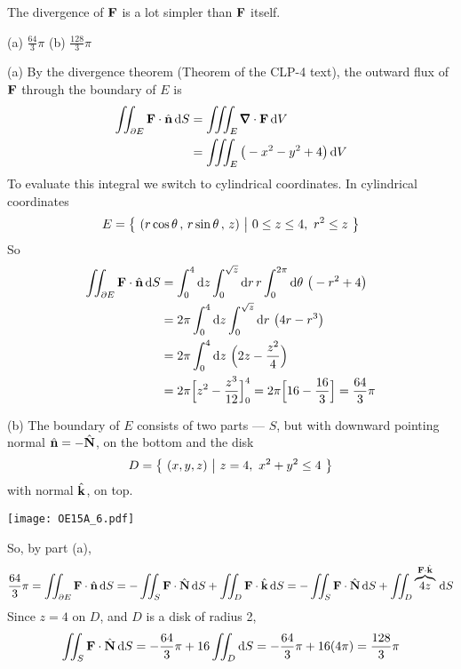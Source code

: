\begin{hint} 
The divergence of $\mathbf{F}$ is a lot simpler than $\mathbf{F}$ itself.
\end{hint}

\begin{answer} 
(a) $\frac{64}{3}\pi$\qquad
(b) $\frac{128}{3}\pi$
\end{answer}

\begin{solution} (a)
By the divergence theorem (Theorem  of the 
CLP-4 text), the outward flux of $\mathbf{F}$ through the boundary of $E$ is
\begin{align*}
\dblInt_{\partial E}\vF\cdot\hn\,\dee{S}
&=\tripInt_E \vnabla\cdot\vF\,\dee{V} \\
&=\tripInt_E \big(-x^2-y^2+4\big)\,\dee{V} 
\end{align*}
To evaluate this integral we switch to cylindrical coordinates.
In cylindrical coordinates
\begin{equation*}
E=\big\{ \ (r\cos\theta\,,\,r\sin\theta\,,\,z)\ \big|\ 0\le z\le 4,\ r^2\le z\ \big\}
\end{equation*}
So
\begin{align*}
\dblInt_{\partial E}\vF\cdot\hn\,\dee{S}
&=\int_0^4\dee{z}\int_0^{\sqrt{z}}\dee{r}\,r\int_0^{2\pi}\dee{\theta}\ 
         \big(-r^2+4\big) \\
&=2\pi \int_0^4\dee{z}\int_0^{\sqrt{z}}\dee{r}\ \big(4r-r^3\big) \\
&=2\pi \int_0^4\dee{z}\ \Big(2z-\frac{z^2}{4}\Big) \\
&= 2\pi\Big[z^2-\frac{z^3}{12}\Big]_0^4
=2\pi\Big[16-\frac{16}{3}\Big]
=\frac{64}{3}\pi
\end{align*}

(b) The boundary of $E$ consists of two parts --- $S$, but with downward
pointing normal $\hat{\mathbf{n}} = -\hat{\mathbf{N}}$, on the bottom and the disk
\begin{equation*}
D =\big\{ \ (x,y,z)\ \big|\ z=4,\ x^2+y^2\le 4\ \big\}
\end{equation*} 
with normal $\hat{\mathbf{k}}$, on top.
 \begin{center}
    \texttt{[image: OE15A\_6.pdf]}
\end{center}
So, by part (a),
\begin{align*}
\frac{64}{3}\pi =\iint_{\partial E}\mathbf{F}\cdot\hat{\mathbf{n}}\,\mathrm{d}S
=-\iint_S \mathbf{F}\cdot\hat{\mathbf{N}}\,\mathrm{d}S 
  +\iint_D \mathbf{F}\cdot\hat{\mathbf{k}}\,\mathrm{d}S
=-\iint_S \mathbf{F}\cdot\hat{\mathbf{N}}\,\mathrm{d}S 
  +\iint_D \overbrace{4z}^{\mathbf{F}\cdot\hat{\mathbf{k}}}\,\mathrm{d}S
\end{align*}
Since $z=4$ on $D$, and $D$ is a disk of radius 2,
\begin{align*}
\iint_S \mathbf{F}\cdot\hat{\mathbf{N}}\,\mathrm{d}S 
=-\frac{64}{3}\pi +16\iint_D \mathrm{d}S
=-\frac{64}{3}\pi +16(4\pi)
=\frac{128}{3}\pi
\end{align*}
\end{solution}

